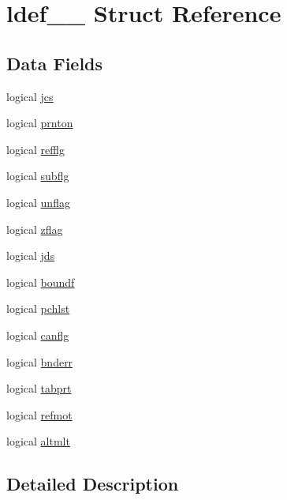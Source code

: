 \hypertarget{structldef__1__}{}\section{ldef\+\_\+\_\+ Struct Reference}
\label{structldef__1__}
\subsection*{Data Fields}
\begin{DoxyCompactItemize}
\item 
logical \hyperlink{structldef__1___ab11a592fc4ff99daaba09d08102f2093}{jcs}
\item 
logical \hyperlink{structldef__1___ab875319657e6ab84536f363db335ca41}{prnton}
\item 
logical \hyperlink{structldef__1___a1bcd3bdbab8897c519d3cb6aa275df9c}{refflg}
\item 
logical \hyperlink{structldef__1___a921600502ee0b2c004b7a63a54212194}{subflg}
\item 
logical \hyperlink{structldef__1___a92e44f1effd7373161ffd2f2b3644e45}{unflag}
\item 
logical \hyperlink{structldef__1___a6ff73db9e6d009df5ebecfea161e4d26}{zflag}
\item 
logical \hyperlink{structldef__1___aff9475dcd7f6611f39f142eee1f12283}{jds}
\item 
logical \hyperlink{structldef__1___a857a66fe9e592c827bade65b63742171}{boundf}
\item 
logical \hyperlink{structldef__1___a0d6a50d2a4cebdd1690abed362b7de17}{pchlst}
\item 
logical \hyperlink{structldef__1___aebe6555c14ff660a4189146a61060f16}{canflg}
\item 
logical \hyperlink{structldef__1___ad481fabe50e2fd12d977ff4d1baacb66}{bnderr}
\item 
logical \hyperlink{structldef__1___a76edec6175d7b1adfc49d8a479e3b5c2}{tabprt}
\item 
logical \hyperlink{structldef__1___a7a8635d7699644098793f3996e1c482b}{refmot}
\item 
logical \hyperlink{structldef__1___a760a95e10f06e8ca5be1158a5f5bfeb4}{altmlt}
\end{DoxyCompactItemize}


\subsection{Detailed Description}


